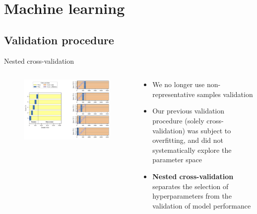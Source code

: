\documentclass[9pt,aspectratio=169]{beamer}
\begin{document}
\section{Machine learning}

\subsection{Validation procedure}

\begin{frame}{Nested cross-validation}
\begin{columns}
	\begin{column}{0.682\linewidth}
		\begin{figure}
			\includegraphics[width=\linewidth]{../figures/si_figure_2.pdf}
		\end{figure}
		
	\end{column}
	\begin{column}{0.318\linewidth}
		\begin{itemize}
			\item We no longer use non-representative samples validation 
			\item Our previous validation procedure (solely cross-validation) was subject to overfitting, and did not systematically explore the parameter space
			\item \textbf{Nested cross-validation} separates the selection of hyperparameters from the validation of model performance 
		\end{itemize}
	\end{column}
\end{columns}
\end{frame}
\end{document}
